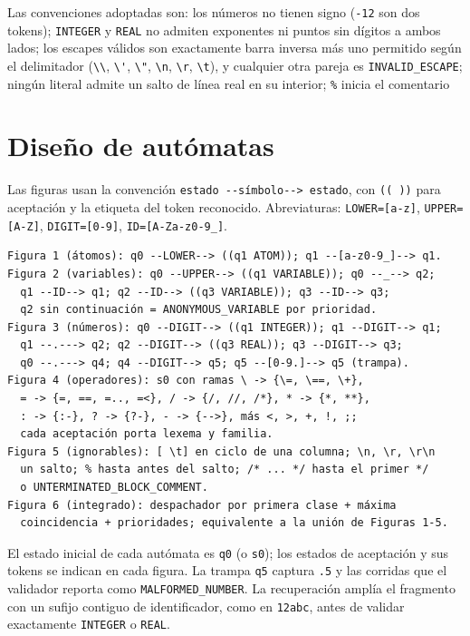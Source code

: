 \documentclass[11pt,a4paper]{article}
\begin{document}
Las convenciones adoptadas son: los números no tienen signo
(\verb|-12| son dos tokens); \verb|INTEGER| y \verb|REAL| no admiten
exponentes ni puntos sin dígitos a ambos lados; los escapes válidos
son exactamente barra inversa más uno permitido según el delimitador
(\verb|\\|, \verb|\'|, \verb|\"|, \verb|\n|, \verb|\r|, \verb|\t|), y
cualquier otra pareja es \verb|INVALID_ESCAPE|; ningún literal admite
un salto de línea real en su interior; \verb|%| inicia el comentario

\section{Diseño de autómatas}
Las figuras usan la convención \verb|estado --símbolo--> estado|, con
\verb|(( ))| para aceptación y la etiqueta del token reconocido.
Abreviaturas: \verb|LOWER=[a-z]|, \verb|UPPER=[A-Z]|,
\verb|DIGIT=[0-9]|, \verb|ID=[A-Za-z0-9_]|.

\begin{verbatim}
Figura 1 (átomos): q0 --LOWER--> ((q1 ATOM)); q1 --[a-z0-9_]--> q1.
Figura 2 (variables): q0 --UPPER--> ((q1 VARIABLE)); q0 --_--> q2;
  q1 --ID--> q1; q2 --ID--> ((q3 VARIABLE)); q3 --ID--> q3;
  q2 sin continuación = ANONYMOUS_VARIABLE por prioridad.
Figura 3 (números): q0 --DIGIT--> ((q1 INTEGER)); q1 --DIGIT--> q1;
  q1 --.---> q2; q2 --DIGIT--> ((q3 REAL)); q3 --DIGIT--> q3;
  q0 --.---> q4; q4 --DIGIT--> q5; q5 --[0-9.]--> q5 (trampa).
Figura 4 (operadores): s0 con ramas \ -> {\=, \==, \+},
  = -> {=, ==, =.., =<}, / -> {/, //, /*}, * -> {*, **},
  : -> {:-}, ? -> {?-}, - -> {-->}, más <, >, +, !, ;;
  cada aceptación porta lexema y familia.
Figura 5 (ignorables): [ \t] en ciclo de una columna; \n, \r, \r\n
  un salto; % hasta antes del salto; /* ... */ hasta el primer */
  o UNTERMINATED_BLOCK_COMMENT.
Figura 6 (integrado): despachador por primera clase + máxima
  coincidencia + prioridades; equivalente a la unión de Figuras 1-5.
\end{verbatim}

El estado inicial de cada autómata es \verb|q0| (o \verb|s0|); los
estados de aceptación y sus tokens se indican en cada figura. La
trampa \verb|q5| captura \verb|.5| y las corridas que el validador
reporta como \verb|MALFORMED_NUMBER|. La recuperación amplía el
fragmento con un sufijo contiguo de identificador, como en
\verb|12abc|, antes de validar exactamente \verb|INTEGER| o
\verb|REAL|.
\end{document}
